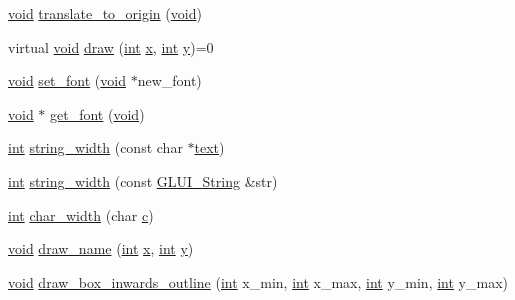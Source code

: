 \begin{DoxyCompactItemize}
\item 
\hyperlink{wglext_8h_a9e6b7f1933461ef318bb000d6bd13b83}{void} \hyperlink{class_g_l_u_i___control_a11ae15dcbb0ed5136b471a77eda41266}{translate\+\_\+to\+\_\+origin} (\hyperlink{wglext_8h_a9e6b7f1933461ef318bb000d6bd13b83}{void})
\item 
virtual \hyperlink{wglext_8h_a9e6b7f1933461ef318bb000d6bd13b83}{void} \hyperlink{class_g_l_u_i___control_a2eb42d7a7951280ad2fe8c37972bf66a}{draw} (\hyperlink{wglext_8h_a500a82aecba06f4550f6849b8099ca21}{int} \hyperlink{glext_8h_ad77deca22f617d3f0e0eb786445689fc}{x}, \hyperlink{wglext_8h_a500a82aecba06f4550f6849b8099ca21}{int} \hyperlink{glext_8h_a9298c7ad619074f5285b32c6b72bfdea}{y})=0
\item 
\hyperlink{wglext_8h_a9e6b7f1933461ef318bb000d6bd13b83}{void} \hyperlink{class_g_l_u_i___control_ae317f3c30fbd4cad6bd91523c7e3e6b0}{set\+\_\+font} (\hyperlink{wglext_8h_a9e6b7f1933461ef318bb000d6bd13b83}{void} $\ast$new\+\_\+font)
\item 
\hyperlink{wglext_8h_a9e6b7f1933461ef318bb000d6bd13b83}{void} $\ast$ \hyperlink{class_g_l_u_i___control_af659cbe80e9a5bdfd4fbff4366d4ce4f}{get\+\_\+font} (\hyperlink{wglext_8h_a9e6b7f1933461ef318bb000d6bd13b83}{void})
\item 
\hyperlink{wglext_8h_a500a82aecba06f4550f6849b8099ca21}{int} \hyperlink{class_g_l_u_i___control_a57ed4e7d0b82e459fb713a9bf29db12b}{string\+\_\+width} (const char $\ast$\hyperlink{class_g_l_u_i___control_af0d60e9736f4dbc34e9a536e75876d72}{text})
\item 
\hyperlink{wglext_8h_a500a82aecba06f4550f6849b8099ca21}{int} \hyperlink{class_g_l_u_i___control_a9d129d259e01c1b28f4fc7a7a7830189}{string\+\_\+width} (const \hyperlink{glui_8h_aada824856f7bcf29794719981ebd8f60}{G\+L\+U\+I\+\_\+\+String} \&str)
\item 
\hyperlink{wglext_8h_a500a82aecba06f4550f6849b8099ca21}{int} \hyperlink{class_g_l_u_i___control_ae56ff4899b691fc25332071f8f4c15f3}{char\+\_\+width} (char \hyperlink{glext_8h_a1f2d7f8147412c43ba2303a56f97ee73}{c})
\item 
\hyperlink{wglext_8h_a9e6b7f1933461ef318bb000d6bd13b83}{void} \hyperlink{class_g_l_u_i___control_aacacd563742e3e48bc5f27643e4a514c}{draw\+\_\+name} (\hyperlink{wglext_8h_a500a82aecba06f4550f6849b8099ca21}{int} \hyperlink{glext_8h_ad77deca22f617d3f0e0eb786445689fc}{x}, \hyperlink{wglext_8h_a500a82aecba06f4550f6849b8099ca21}{int} \hyperlink{glext_8h_a9298c7ad619074f5285b32c6b72bfdea}{y})
\item 
\hyperlink{wglext_8h_a9e6b7f1933461ef318bb000d6bd13b83}{void} \hyperlink{class_g_l_u_i___control_adba9e88ff56a8ea0596e6b1ede3d4b9d}{draw\+\_\+box\+\_\+inwards\+\_\+outline} (\hyperlink{wglext_8h_a500a82aecba06f4550f6849b8099ca21}{int} x\+\_\+min, \hyperlink{wglext_8h_a500a82aecba06f4550f6849b8099ca21}{int} x\+\_\+max, \hyperlink{wglext_8h_a500a82aecba06f4550f6849b8099ca21}{int} y\+\_\+min, \hyperlink{wglext_8h_a500a82aecba06f4550f6849b8099ca21}{int} y\+\_\+max)

\end{DoxyCompactItemize}
